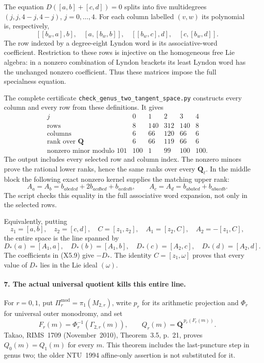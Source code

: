 The equation $D([a,b]+[c,d])=0$ splits into five
multidegrees $(j,j,4-j,4-j)$, $j=0,\ldots,4$. For each
column labelled $(v,w)$ its polynomial is, respectively,
\[
 [[b_w,a],b],\quad [a,[b_w,b]],\quad
 [[b_w,c],d],\quad [c,[b_w,d]].
\]
The row indexed by a degree-eight Lyndon word is its
associative-word coefficient. Restriction to these rows
is injective on the homogeneous free Lie algebra: in a
nonzero combination of Lyndon brackets its least Lyndon
word has the unchanged nonzero coefficient. Thus these
matrices impose the full specialness equation.

The complete certificate
\texttt{check\_genus\_two\_tangent\_space.py} constructs
every column and every row from these definitions. It
gives
\[
\begin{array}{c|rrrrr}
 j&0&1&2&3&4\\\hline
 \text{rows}&8&140&312&140&8\\
 \text{columns}&6&66&120&66&6\\
 \text{rank over }\mathbf Q&6&66&119&66&6\\
 \text{nonzero minor modulo }101&100&1&99&100&100.
\end{array}
\tag{X5.8}
\]
The output includes every selected row and column index.
The nonzero minors prove the rational lower ranks, hence
the same ranks over every $\mathbf Q_\ell$. In the middle
block the following exact nonzero kernel supplies the
matching upper rank:
\[
 A_a=A_b=b_{abcdcd}+2b_{acdbcd}+b_{acdcdb},\qquad
 A_c=A_d=b_{ababcd}+b_{abacdb}.
 \tag{X5.9}
\]
The script checks this equality in the full associative
word expansion, not only in the selected rows.

Equivalently, putting
\[
 z_1=[a,b],\quad z_2=[c,d],\quad C=[z_1,z_2],
 \quad A_1=[z_2,C],\quad A_2=-[z_1,C],
\]
the entire space is the line spanned by
\[
 D_*(a)=[A_1,a],\quad D_*(b)=[A_1,b],\quad
 D_*(c)=[A_2,c],\quad D_*(d)=[A_2,d].
 \tag{X5.10}
\]
The coefficients in (X5.9) give $-D_*$. The identity
$C=[z_1,\omega]$ proves that every value of $D_*$ lies
in the Lie ideal $(\omega)$.

\paragraph{7. The actual universal quotient kills this entire line.}
For $r=0,1$, put
$\Pi_r^{\mathrm{mod}}=\pi_1(M_{2,r})$, write $p_r$ for
its arithmetic projection and $\Phi_r$ for universal outer
monodromy, and set
\[
 F_r(m)=\Phi_r^{-1}(\Gamma_{2,r}(m)),\qquad
 Q_r(m)=\overline{\mathbf Q}^{\,p_r(F_r(m))}.
\]
Takao, RIMS~1709 (November~2010), Theorem~3.5, p.~21,
proves $Q_0(m)=Q_1(m)$ for every $m$. This theorem includes
the last-puncture step in genus two; the older NTU~1994
affine-only assertion is not substituted for it.

